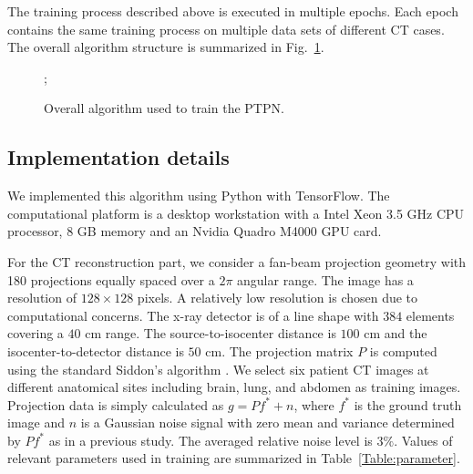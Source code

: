 \documentclass[journal]{IEEEtran}
\begin{document}
The training process described above is executed in multiple epochs. Each epoch contains the same training process on multiple data sets of different CT cases. The overall algorithm structure is summarized in Fig.~\ref{Fig:trainingAlgorithm}. 

\begin{figure}
\begin{algorithmic}[1]
			;
							
		\ENDFOR
	\ENDFOR
\ENDFOR
\end{algorithmic}
\caption{Overall algorithm used to train the PTPN.}
\label{Fig:trainingAlgorithm}
\end{figure}

\subsection{Implementation details}
We implemented this algorithm using Python with TensorFlow. The computational platform is a desktop workstation with a Intel Xeon 3.5 GHz CPU processor, 8 GB memory and an Nvidia Quadro M4000 GPU card.

For the CT reconstruction part, we consider a fan-beam projection geometry with 180 projections equally spaced over a $2\pi$ angular range. The image has a resolution of $128\times 128$ pixels. A relatively low resolution is chosen due to computational concerns. The x-ray detector is of a line shape with $384$ elements covering a $40$ cm range. The source-to-isocenter distance is $100$ cm and the isocenter-to-detector distance is $50$ cm. The projection matrix $P$ is computed using the standard Siddon's algorithm \cite{Siddon:1985:MP}. We select six patient CT images at different anatomical sites including brain, lung, and abdomen as training images. Projection data is simply calculated as  $g=Pf^*+n$, where $f^*$ is the ground truth image and $n$ is a Gaussian noise signal with zero mean and variance determined by $Pf^*$ as in a previous study\cite{Wang:PMB:2008}. The averaged relative noise level is $3\%$. Values of relevant parameters used in training are summarized in Table~\ref{Table:parameter}.
\end{document}
